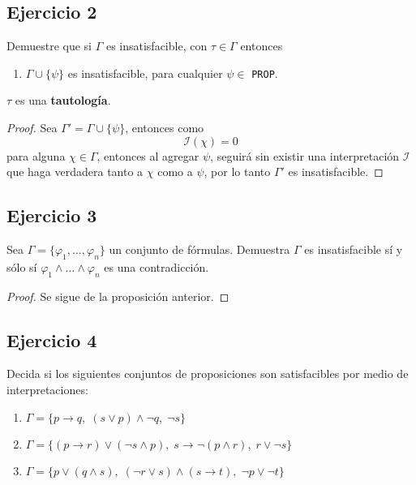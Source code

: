 \documentclass[a4paper]{article}
\begin{document}
\subsection{Ejercicio 2}
Demuestre que si \(\Gamma\) es insatisfacible, con \(\tau \in \Gamma\) entonces
\begin{enumerate}
    \item $\Gamma\cup\{\psi\}$ es insatisfacible, para cualquier \(\psi \in\) \texttt{PROP}.
\end{enumerate}
\(\tau\) es una \textbf{tautología}.
\begin{proof}
    Sea \(\Gamma' = \Gamma \cup \{\psi\}\), entonces
    como 
    \[
        \mathcal{I}\left(\chi\right) = 0
    \]
    para alguna \(\chi \in \Gamma\), entonces al agregar \(\psi\), seguirá sin existir una interpretación
    \(\mathcal{I}\) que haga verdadera tanto a \(\chi\) como a \(\psi\), por lo tanto \(\Gamma'\) es 
    insatisfacible.
\end{proof}
\subsection{Ejercicio 3}
\noindent
Sea $\Gamma=\{\varphi_1,\ldots,\varphi_n\}$ un conjunto de fórmulas. Demuestra $\Gamma$ es insatisfacible sí y sólo sí $\varphi_1\land\ldots\land\varphi_n$ es
una contradicción.
\begin{proof}
    Se sigue de la proposición anterior.
\end{proof}
\subsection{Ejercicio 4}
Decida si los siguientes conjuntos de proposiciones son satisfacibles por
medio de interpretaciones:
\begin{enumerate}
    \item $\Gamma = \{ p \to q,\; (s \lor p) \land \lnot q,\;\lnot s\}$
    \item $\Gamma = \{(p \to r) \lor (\lnot s \land p),\; s \to \lnot(p \land r),\; r \lor
    \lnot s\}$
    \item $\Gamma = \{p\lor (q\land s),\; (\lnot r \lor s) \land (s\to t),\; \lnot p \lor
    \lnot
t \} $
\end{enumerate}
\end{document}
